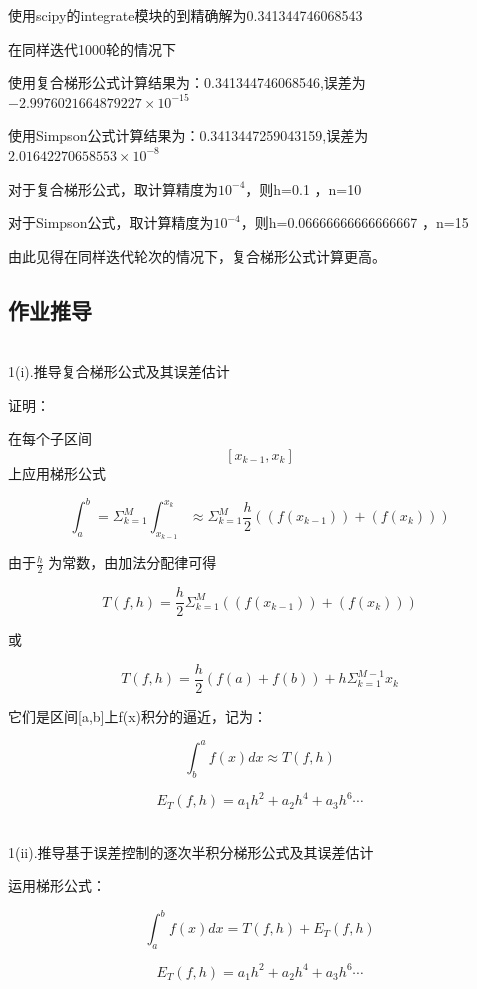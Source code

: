 \documentclass[UTF8]{ctexart}
\begin{document}
使用scipy的integrate模块的到精确解为0.341344746068543

在同样迭代1000轮的情况下


使用复合梯形公式计算结果为：0.341344746068546,误差为$ -2.9976021664879227 \times 10^{-15} $

使用Simpson公式计算结果为：0.3413447259043159,误差为$ 2.01642270658553 \times 10^{-8} $

对于复合梯形公式，取计算精度为$ 10 ^ {-4} $，则h=0.1 ，n=10

对于Simpson公式，取计算精度为$ 10 ^ {-4} $，则h=0.06666666666666667 ，n=15


由此见得在同样迭代轮次的情况下，复合梯形公式计算更高。







\newpage
\subsection{作业推导}
~\\
1(i).推导复合梯形公式及其误差估计

证明：

在每个子区间$$[x_{k-1},x_k]$$上应用梯形公式


$$\int_{a}^{b} = \Sigma_{k=1}^{M} \int_{x_{k-1}}^{x_k} \approx \Sigma_{k=1}^{M} \frac{h}{2} ((f(x_{k-1}))+(f(x_k))) $$


由于$\frac{h}{2}$ 为常数，由加法分配律可得


$$
T(f,h)= \frac{h}{2} \Sigma_{k=1}^{M}  ((f(x_{k-1}))+(f(x_k)))
$$

或

$$
T(f,h)=\frac{h}{2} (f(a)+f(b)) + h \Sigma_{k=1}^{M-1} x_k
$$

它们是区间[a,b]上f(x)积分的逼近，记为：

$$
\int_{b}^{a} f(x) dx \approx T(f,h)$$




$$
E_T (f,h)=a_1h^2+a_2h^4+a_3h^6\cdots
$$






~\\



1(ii).推导基于误差控制的逐次半积分梯形公式及其误差估计


运用梯形公式：

$$\int_{a}^{b} f(x) dx =T(f,h)+E_T (f,h)$$


$$
E_T (f,h)=a_1h^2+a_2h^4+a_3h^6\cdots
$$
\end{document}
